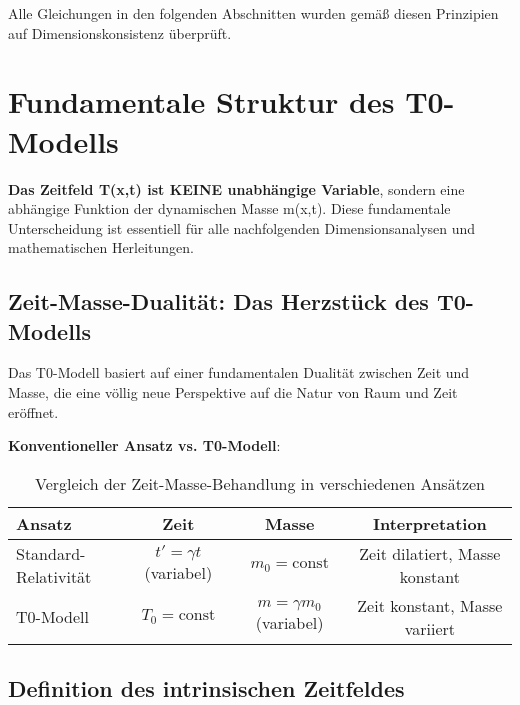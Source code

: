 \documentclass[12pt,a4paper]{article}
\begin{document}
	Alle Gleichungen in den folgenden Abschnitten wurden gemäß diesen Prinzipien auf Dimensionskonsistenz überprüft.
	
	\section{Fundamentale Struktur des T0-Modells}
	\label{sec:fundamental_structure}
	
	\begin{tcolorbox}[colback=red!5!white,colframe=red!75!black,title=Kritischer Hinweis zur mathematischen Struktur]
		\textbf{Das Zeitfeld T(x,t) ist KEINE unabhängige Variable}, sondern eine abhängige Funktion der dynamischen Masse m(x,t). Diese fundamentale Unterscheidung ist essentiell für alle nachfolgenden Dimensionsanalysen und mathematischen Herleitungen.
	\end{tcolorbox}
	
	\subsection{Zeit-Masse-Dualität: Das Herzstück des T0-Modells}
	\label{subsec:time_mass_duality}
	
	Das T0-Modell basiert auf einer fundamentalen Dualität zwischen Zeit und Masse, die eine völlig neue Perspektive auf die Natur von Raum und Zeit eröffnet.
	
	\textbf{Konventioneller Ansatz vs. T0-Modell}:
	
	\begin{table}[htbp]
		\centering
		\begin{tabular}{|l|c|c|c|}
			\hline
			\textbf{Ansatz} & \textbf{Zeit} & \textbf{Masse} & \textbf{Interpretation} \\
			\hline
			Standard-Relativität & $t' = \gamma t$ (variabel) & $m_0 = \text{const}$ & Zeit dilatiert, Masse konstant \\
			\hline
			T0-Modell & $T_0 = \text{const}$ & $m = \gamma m_0$ (variabel) & Zeit konstant, Masse variiert \\
			\hline
		\end{tabular}
		\caption{Vergleich der Zeit-Masse-Behandlung in verschiedenen Ansätzen}
	\end{table}
	
	\subsection{Definition des intrinsischen Zeitfeldes}
	
\end{document}
